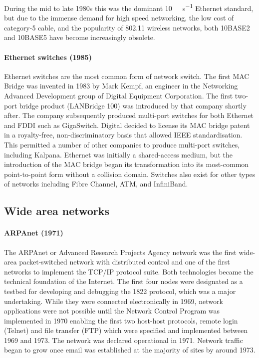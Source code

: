 {During the mid to late 1980s this was the dominant \SI{10}{\mega\bit\per\second} Ethernet standard, but due to the immense demand for high speed networking, the low cost of category-5 cable, and the popularity of 802.11 wireless networks, both 10BASE2 and 10BASE5 have become increasingly obsolete.

\paragraph{Ethernet switches (1985)}
Ethernet switches are the most common form of network switch.
The first MAC Bridge was invented in 1983 by Mark Kempf, an engineer in the Networking Advanced Development group of Digital Equipment Corporation.
The first two-port bridge product (LANBridge 100) was introduced by that company shortly after.
The company subsequently produced multi-port switches for both Ethernet and FDDI such as GigaSwitch.
Digital decided to license its MAC bridge patent in a royalty-free, non-dis\-crim\-i\-na\-tory basis that allowed IEEE standardisation.
This permitted a number of other companies to produce multi-port switches, including Kalpana.
Ethernet was initially a shared-access medium, but the introduction of the MAC bridge began its transformation into its most-common point-to-point form without a collision domain.
Switches also exist for other types of networks including Fibre Channel, ATM, and InfiniBand.
    
\subsection{Wide area networks}
\label{sec:network-evoluation-wan}

\paragraph{ARPAnet (1971)}
The ARPAnet or Advanced Research Projects Agency network was the first wide-area packet-switched network with distributed control and one of the first networks to implement the TCP/IP protocol suite.
Both technologies became the technical foundation of the Internet.
The first four nodes were designated as a testbed for developing and debugging the 1822 protocol, which was a major undertaking.
While they were connected electronically in 1969, network applications were not possible until the Network Control Program was implemented in 1970 enabling the first two host-host protocols, remote login (Telnet) and file transfer (FTP) which were specified and implemented between 1969 and 1973.
The network was declared operational in 1971.
Network traffic began to grow once email was established at the majority of sites by around 1973.

}
